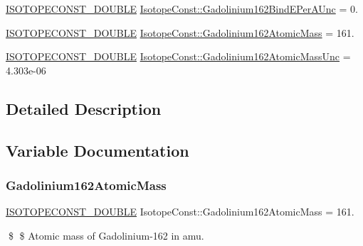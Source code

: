 \begin{DoxyCompactItemize}
\item 
\mbox{\hyperlink{group___isotope_const-_macros_ga8f45a7272ce02c0b4c65c44636ed719a}{I\+S\+O\+T\+O\+P\+E\+C\+O\+N\+S\+T\+\_\+\+D\+O\+U\+B\+LE}} \mbox{\hyperlink{group___isotope_const-_gadolinium-_gd162_ga108c4e92cdf425b189a256aa14691eef}{Isotope\+Const\+::\+Gadolinium162\+Bind\+E\+Per\+A\+Unc}} = 0.
\item 
\mbox{\hyperlink{group___isotope_const-_macros_ga8f45a7272ce02c0b4c65c44636ed719a}{I\+S\+O\+T\+O\+P\+E\+C\+O\+N\+S\+T\+\_\+\+D\+O\+U\+B\+LE}} \mbox{\hyperlink{group___isotope_const-_gadolinium-_gd162_ga09e8bf0936e8af784e8abce14b4c3625}{Isotope\+Const\+::\+Gadolinium162\+Atomic\+Mass}} = 161.
\item 
\mbox{\hyperlink{group___isotope_const-_macros_ga8f45a7272ce02c0b4c65c44636ed719a}{I\+S\+O\+T\+O\+P\+E\+C\+O\+N\+S\+T\+\_\+\+D\+O\+U\+B\+LE}} \mbox{\hyperlink{group___isotope_const-_gadolinium-_gd162_ga727bdd31e5d4943769589c44a90ddcf1}{Isotope\+Const\+::\+Gadolinium162\+Atomic\+Mass\+Unc}} = 4.\+303e-\/06
\end{DoxyCompactItemize}


\subsection{Detailed Description}


\subsection{Variable Documentation}
\mbox{\label{group___isotope_const-_gadolinium-_gd162_ga09e8bf0936e8af784e8abce14b4c3625}} 
\subsubsection{\texorpdfstring{Gadolinium162\+Atomic\+Mass}{Gadolinium162AtomicMass}}
{\footnotesize\ttfamily \mbox{\hyperlink{group___isotope_const-_macros_ga8f45a7272ce02c0b4c65c44636ed719a}{I\+S\+O\+T\+O\+P\+E\+C\+O\+N\+S\+T\+\_\+\+D\+O\+U\+B\+LE}} Isotope\+Const\+::\+Gadolinium162\+Atomic\+Mass = 161.}

\$ \$ Atomic mass of Gadolinium-\/162 in amu. \mbox{\label{group___isotope_const-_gadolinium-_gd162_ga727bdd31e5d4943769589c44a90ddcf1}} 
